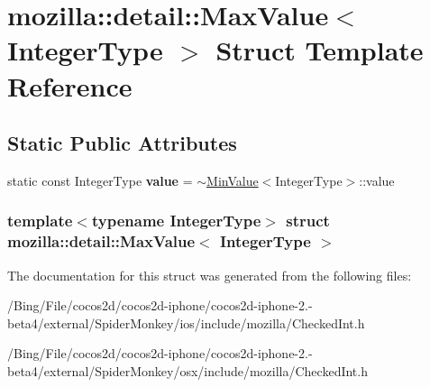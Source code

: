 \hypertarget{structmozilla_1_1detail_1_1_max_value}{\section{mozilla\-:\-:detail\-:\-:Max\-Value$<$ Integer\-Type $>$ Struct Template Reference}
\label{structmozilla_1_1detail_1_1_max_value}
}
\subsection*{Static Public Attributes}
\begin{DoxyCompactItemize}
\item 
\hypertarget{structmozilla_1_1detail_1_1_max_value_a80211d3e1860b28915b199c7a6846181}{static const Integer\-Type {\bfseries value} = $\sim$\hyperlink{structmozilla_1_1detail_1_1_min_value}{Min\-Value}$<$Integer\-Type$>$\-::value}\label{structmozilla_1_1detail_1_1_max_value_a80211d3e1860b28915b199c7a6846181}

\end{DoxyCompactItemize}
\subsubsection*{template$<$typename Integer\-Type$>$ struct mozilla\-::detail\-::\-Max\-Value$<$ Integer\-Type $>$}



The documentation for this struct was generated from the following files\-:\begin{DoxyCompactItemize}
\item 
/\-Bing/\-File/cocos2d/cocos2d-\/iphone/cocos2d-\/iphone-\/2.-\/beta4/external/\-Spider\-Monkey/ios/include/mozilla/Checked\-Int.\-h\item 
/\-Bing/\-File/cocos2d/cocos2d-\/iphone/cocos2d-\/iphone-\/2.-\/beta4/external/\-Spider\-Monkey/osx/include/mozilla/Checked\-Int.\-h\end{DoxyCompactItemize}
